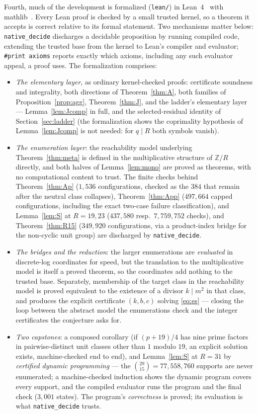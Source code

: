 \documentclass[11pt]{article}
\theoremstyle{plain}
\theoremstyle{remark}
\theoremstyle{plain}
\numberwithin{equation}{section}
\begin{document}
Fourth, much of the development is formalized (\texttt{lean/}) in
Lean~4~\cite{Lean4} with mathlib~\cite{mathlib}. Every Lean proof is
checked by a small trusted kernel, so a theorem it accepts is correct
relative to its formal statement. Two mechanisms matter below:
\texttt{native\_decide} discharges a decidable proposition by running
compiled code, extending the trusted base from the kernel to Lean's
compiler and evaluator; \texttt{\#print axioms} reports exactly which
axioms, including any such evaluator appeal, a proof uses. The
formalization comprises:
\begin{itemize}
\item \emph{The elementary layer}, as ordinary kernel-checked proofs:
  certificate soundness and integrality, both directions of
  Theorem~\ref{thm:A}, both families of Proposition~\ref{prop:agg},
  Theorem~\ref{thm:J}, and the ladder's elementary layer ---
  Lemma~\ref{lem:Jcomp} in full, and the
  selected-residual identity of Section~\ref{sec:ladder}
  (the formalization shows the coprimality hypothesis of
  Lemma~\ref{lem:Jcomp} is not needed: for $q \mid R$ both symbols
  vanish).
\item \emph{The enumeration layer}: the reachability model underlying
  Theorem~\ref{thm:meta} is defined in the multiplicative structure
  of $\mathbb{Z}/R$ directly, and both halves of
  Lemma~\ref{lem:mono} are proved as theorems, with no computational
  content to trust. The finite checks behind Theorem~\ref{thm:Ap}
  ($1{,}536$ configurations, checked as the $384$ that remain after
  the neutral class collapses), Theorem~\ref{thm:App} ($497{,}664$
  capped configurations, including the exact two-case failure
  classification), and Lemma~\ref{lem:S} at $R = 19, 23$
  ($437{,}580$ resp.\ $7{,}759{,}752$ checks), and
  Theorem~\ref{thm:R15} ($349{,}920$ configurations, via a
  product-index bridge for the non-cyclic unit group) are discharged
  by \texttt{native\_decide}.
\item \emph{The bridges and the reduction}: the larger enumerations
  are \emph{evaluated} in discrete-log coordinates for speed, but the
  translation to the multiplicative model is itself a proved theorem,
  so the coordinates add nothing to the trusted base. Separately,
  membership of the target class in the reachability model is proved
  equivalent to the existence of a divisor $k \mid m^2$ in that class,
  and produces the explicit certificate $(k, b, c)$ solving
  \eqref{eq:es} --- closing the loop between the abstract model the
  enumerations check and the integer certificates the conjecture asks
  for.
\item \emph{Two capstones}: a composed corollary (if $(p+19)/4$ has
  nine prime factors in pairwise-distinct unit classes other than $1$
  modulo $19$, an explicit solution exists, machine-checked end to
  end), and Lemma~\ref{lem:S} at $R = 31$ by \emph{certified dynamic
  programming} --- the $\binom{29}{15} = 77{,}558{,}760$ supports are
  never enumerated; a machine-checked induction shows the dynamic
  program covers every support, and the compiled evaluator runs the
  program and the final check ($3{,}001$ states). The program's
  \emph{correctness} is proved; its evaluation is what
  \texttt{native\_decide} trusts.
\end{itemize}
\end{document}
